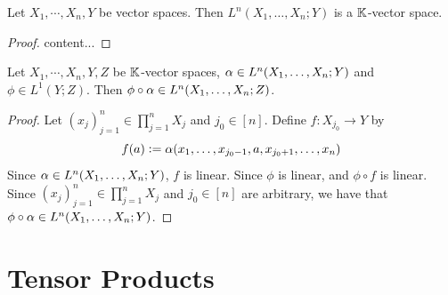\documentclass{book}
\begin{document}
	\begin{defn}
	\end{defn}
	
	\begin{ex}
		Let $X_1, \cdots, X_n, Y$ be vector spaces. Then $L^n(X_1, \ldots, X_n;Y)$ is a $\mathbb{K}$-vector space.
	\end{ex}
	
	\begin{proof}
		content...
	\end{proof}
	
	\begin{ex}
		Let $X_1, \cdots, X_n, Y, Z$ be $\mathbb{K}$-vector spaces, $\alpha \in L^n(X_1, \ldots, X_n;Y)$ and $\phi \in L^1(Y;Z)$. Then $\phi \circ \alpha \in L^n(X_1, \ldots, X_n; Z)$. 
	\end{ex}
	
	\begin{proof}
		Let $(x_j)_{j=1}^n \in \prod\limits_{j=1}^n X_j$ and $j_0 \in [n]$. Define $f:X_{j_0} \rightarrow Y$ by 
		$$f(a) \vcentcolon= \alpha(x_1, \ldots, x_{j_0-1}, a , x_{j_0+1}, \ldots, x_n) $$
		Since $\alpha \in L^n(X_1, \ldots, X_n;Y)$, $f$ is linear. Since $\phi$ is linear, and $\phi \circ f$ is linear. Since $(x_j)_{j=1}^n \in \prod\limits_{j=1}^n X_j$ and $j_0 \in [n]$ are arbitrary, we have that $\phi \circ \alpha \in L^n(X_1, \ldots, X_n;Y)$. 
	\end{proof}
	
	
	
	
	
	
	
	
	
	
	
	
	
	
	
	
	
	
	
	
	
	
	
	
	
	
	
	
	
	
	
	
	
	
	
	
	
	
	
	
	
	
	\newpage
	\section{Tensor Products}
	
\end{document}
